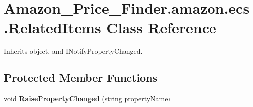 \hypertarget{class_amazon___price___finder_1_1amazon_1_1ecs_1_1_related_items}{\section{Amazon\-\_\-\-Price\-\_\-\-Finder.\-amazon.\-ecs.\-Related\-Items Class Reference}
\label{class_amazon___price___finder_1_1amazon_1_1ecs_1_1_related_items}
}


 




Inherits object, and I\-Notify\-Property\-Changed.

\subsection*{Protected Member Functions}
\begin{DoxyCompactItemize}
\item 
\hypertarget{class_amazon___price___finder_1_1amazon_1_1ecs_1_1_related_items_a3bc49c14535170a3f7fb0df703941bed}{void {\bfseries Raise\-Property\-Changed} (string property\-Name)}\label{class_amazon___price___finder_1_1amazon_1_1ecs_1_1_related_items_a3bc49c14535170a3f7fb0df703941bed}

\end{DoxyCompactItemize}
